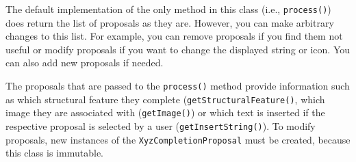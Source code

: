 The default implementation of the only method in this class (i.e.,
\texttt{process()}) does return the list of proposals as they are. However, you
can make arbitrary changes to this list. For example, you can remove proposals
if you find them not useful or modify proposals if you want to change the
displayed string or icon. You can also add new proposals if needed.

The proposals that are passed to the \texttt{process()} method provide 
information such as which structural feature they complete
(\texttt{getStructuralFeature()}, which image they are associated with
(\texttt{getImage()}) or which text is inserted if the respective proposal is
selected by a user (\texttt{getInsertString()}). To modify proposals, new
instances of the \texttt{XyzCompletionProposal} must be created, because this 
class is immutable.
